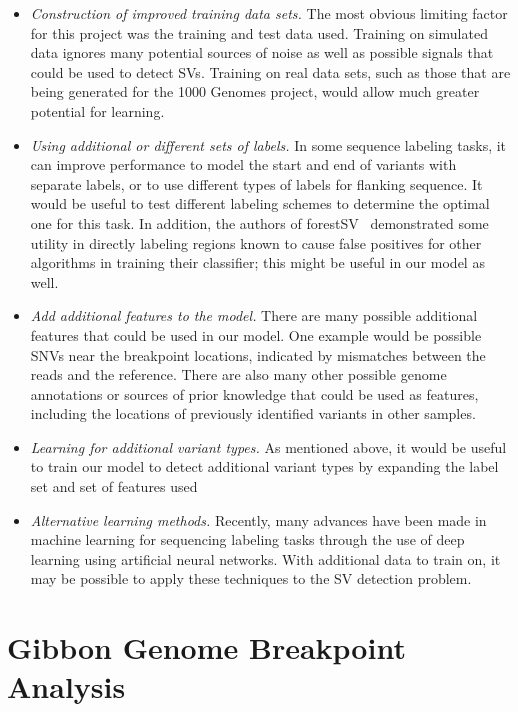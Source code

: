 \begin{itemize}
\item \emph{Construction of improved training data sets.} The most obvious limiting factor for this project was the training and test data used. Training on simulated data ignores many potential sources of noise as well as possible signals that could be used to detect SVs. Training on real data sets, such as those that are being generated for the 1000 Genomes project, would allow much greater potential for learning.
\item \emph{Using additional or different sets of labels.} In some sequence labeling tasks, it can improve performance to model the start and end of variants with separate labels, or to use different types of labels for flanking sequence. It would be useful to test different labeling schemes to determine the optimal one for this task. In addition, the authors of forestSV~\cite{Michaelson:2012fj} demonstrated some utility in directly labeling regions known to cause false positives for other algorithms in training their classifier; this might be useful in our model as well.
\item \emph{Add additional features to the model.} There are many possible additional features that could be used in our model. One example would be possible SNVs near the breakpoint locations, indicated by mismatches between the reads and the reference. There are also many other possible genome annotations or sources of prior knowledge that could be used as features, including the locations of previously identified variants in other samples. 
\item \emph{Learning for additional variant types.} As mentioned above, it would be useful to train our model to detect additional variant types by expanding the label set and set of features used
\item \emph{Alternative learning methods.} Recently, many advances have been made in machine learning for sequencing labeling tasks through the use of deep learning using artificial neural networks. With additional data to train on, it may be possible to apply these techniques to the SV detection problem.
\end{itemize}

\section{Gibbon Genome Breakpoint Analysis}

